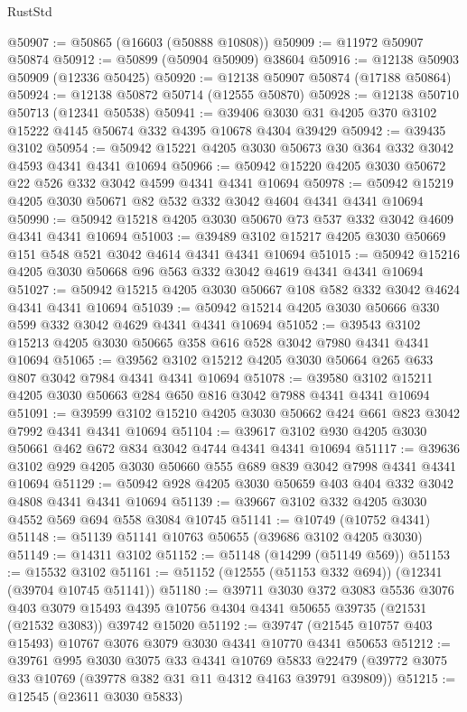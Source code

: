 \begin{lexlean}{RustStd}
\begin{coremodule}
@50907 := @50865 (@16603 (@50888 @10808))
@50909 := @11972 @50907 @50874
@50912 := @50899 (@50904 @50909) @38604
@50916 := @12138 @50903 @50909 (@12336 @50425)
@50920 := @12138 @50907 @50874 (@17188 @50864)
@50924 := @12138 @50872 @50714 (@12555 @50870)
@50928 := @12138 @50710 @50713 (@12341 @50538)
@50941 := @39406 @3030 @31 @4205 @370 @3102 @15222 @4145 @50674 @332 @4395 @10678 @4304 @39429
@50942 := @39435 @3102
@50954 := @50942 @15221 @4205 @3030 @50673 @30 @364 @332 @3042 @4593 @4341 @4341 @10694
@50966 := @50942 @15220 @4205 @3030 @50672 @22 @526 @332 @3042 @4599 @4341 @4341 @10694
@50978 := @50942 @15219 @4205 @3030 @50671 @82 @532 @332 @3042 @4604 @4341 @4341 @10694
@50990 := @50942 @15218 @4205 @3030 @50670 @73 @537 @332 @3042 @4609 @4341 @4341 @10694
@51003 := @39489 @3102 @15217 @4205 @3030 @50669 @151 @548 @521 @3042 @4614 @4341 @4341 @10694
@51015 := @50942 @15216 @4205 @3030 @50668 @96 @563 @332 @3042 @4619 @4341 @4341 @10694
@51027 := @50942 @15215 @4205 @3030 @50667 @108 @582 @332 @3042 @4624 @4341 @4341 @10694
@51039 := @50942 @15214 @4205 @3030 @50666 @330 @599 @332 @3042 @4629 @4341 @4341 @10694
@51052 := @39543 @3102 @15213 @4205 @3030 @50665 @358 @616 @528 @3042 @7980 @4341 @4341 @10694
@51065 := @39562 @3102 @15212 @4205 @3030 @50664 @265 @633 @807 @3042 @7984 @4341 @4341 @10694
@51078 := @39580 @3102 @15211 @4205 @3030 @50663 @284 @650 @816 @3042 @7988 @4341 @4341 @10694
@51091 := @39599 @3102 @15210 @4205 @3030 @50662 @424 @661 @823 @3042 @7992 @4341 @4341 @10694
@51104 := @39617 @3102 @930 @4205 @3030 @50661 @462 @672 @834 @3042 @4744 @4341 @4341 @10694
@51117 := @39636 @3102 @929 @4205 @3030 @50660 @555 @689 @839 @3042 @7998 @4341 @4341 @10694
@51129 := @50942 @928 @4205 @3030 @50659 @403 @404 @332 @3042 @4808 @4341 @4341 @10694
@51139 := @39667 @3102 @332 @4205 @3030 @4552 @569 @694 @558 @3084 @10745
@51141 := @10749 (@10752 @4341)
@51148 := @51139 @51141 @10763 @50655 (@39686 @3102 @4205 @3030)
@51149 := @14311 @3102
@51152 := @51148 (@14299 (@51149 @569))
@51153 := @15532 @3102
@51161 := @51152 (@12555 (@51153 @332 @694)) (@12341 (@39704 @10745 @51141))
@51180 := @39711
    @3030
    @372
    @3083
    @5536
    @3076
    @403
    @3079
    @15493
    @4395
    @10756
    @4304
    @4341
    @50655
    @39735
    (@21531 (@21532 @3083))
    @39742
    @15020
@51192 := @39747 (@21545 @10757 @403 @15493) @10767 @3076 @3079 @3030 @4341 @10770 @4341 @50653
@51212 := @39761
    @995
    @3030
    @3075
    @33
    @4341
    @10769
    @5833
    @22479
    (@39772 @3075 @33 @10769 (@39778 @382 @31 @11 @4312 @4163 @39791 @39809))
@51215 := @12545 (@23611 @3030 @5833)

\end{coremodule}
\end{lexlean}
